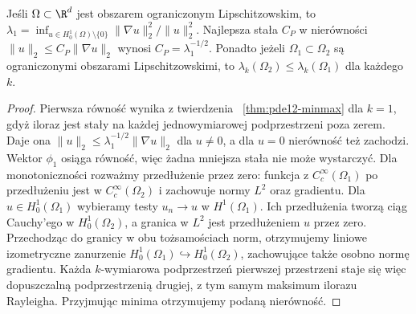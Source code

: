 \begin{wniosek}
\label{cor:pde12-first}
Jeśli $\Omega\subset\R^d$ jest obszarem ograniczonym Lipschitzowskim, to
$\lambda_1=\inf_{u\in H_0^1(\Omega)\setminus\{0\}}
\|\nabla u\|_2^2/\|u\|_2^2$.
Najlepsza stała $C_P$ w nierówności
$\|u\|_2\le C_P\|\nabla u\|_2$ wynosi
$C_P=\lambda_1^{-1/2}$. Ponadto jeżeli
$\Omega_1\subset\Omega_2$ są ograniczonymi obszarami
Lipschitzowskimi, to
$\lambda_k(\Omega_2)\le\lambda_k(\Omega_1)$ dla każdego $k$.
\end{wniosek}
\begin{proof}
Pierwsza równość wynika z twierdzenia
~\ref{thm:pde12-minmax} dla $k=1$, gdyż iloraz jest
stały na każdej jednowymiarowej podprzestrzeni
poza zerem. Daje ona $\|u\|_2\le
\lambda_1^{-1/2}\|\nabla u\|_2$ dla $u\ne0$,
a dla $u=0$ nierówność też zachodzi.
Wektor $\phi_1$ osiąga równość, więc żadna mniejsza
stała nie może wystarczyć.
Dla monotoniczności rozważmy przedłużenie przez zero:
funkcja z $C_c^\infty(\Omega_1)$ po przedłużeniu jest
w $C_c^\infty(\Omega_2)$ i zachowuje normy $L^2$
oraz gradientu. Dla $u\in H_0^1(\Omega_1)$ wybieramy
testy $u_n\to u$ w $H^1(\Omega_1)$. Ich przedłużenia
tworzą ciąg Cauchy'ego w $H_0^1(\Omega_2)$, a granica
w $L^2$ jest przedłużeniem $u$ przez zero. Przechodząc
do granicy w obu tożsamościach norm, otrzymujemy
liniowe izometryczne zanurzenie
$H_0^1(\Omega_1)\hookrightarrow H_0^1(\Omega_2)$,
zachowujące także osobno normę gradientu.
Każda $k$-wymiarowa podprzestrzeń pierwszej przestrzeni
staje się więc dopuszczalną podprzestrzenią drugiej,
z tym samym maksimum ilorazu Rayleigha. Przyjmując minima
otrzymujemy podaną nierówność.
\end{proof}

